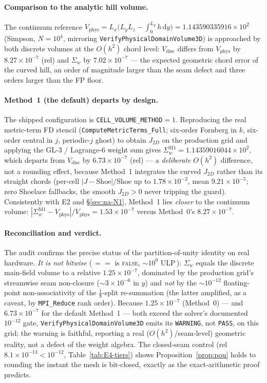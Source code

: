 \documentclass[11pt]{article}
\theoremstyle{definition}
\theoremstyle{remark}
\begin{document}
\paragraph{Comparison to the analytic hill volume.}
The continuum reference $V_{\mathrm{phys}}=L_x\bigl(L_yL_z-\int_0^{L_y}h\,\mathrm
dy\bigr)=1.143590335916\times10^{2}$ (Simpson, $N{=}10^4$, mirroring
\texttt{VerifyPhysicalDomainVolume3D}) is approached by both discrete volumes at
the $O(h^2)$ chord level: $V_{\mathrm{disc}}$ differs from $V_{\mathrm{phys}}$ by
$8.27\times10^{-7}$ (rel) and $\Sigma_w$ by $7.02\times10^{-7}$ --- the expected
geometric chord error of the curved hill, an order of magnitude larger than the
seam defect and three orders larger than the FP floor.

\paragraph{Method~1 (the default) departs by design.}
The shipped configuration is \texttt{CELL\_VOLUME\_METHOD}${=}1$. Reproducing the
real metric-term FD stencil (\texttt{ComputeMetricTerms\_Full}; six-order
Fornberg in $k$, six-order central in $j$, periodic-$j$ ghost) to obtain $J_{2D}$
on the production grid and applying the GL-3 / Lagrange-6 weight sum gives
$\Sigma_w^{\mathrm{M1}}=1.14359016044\times10^{2}$, which departs from
$V_{\mathrm{disc}}$ by $6.73\times10^{-7}$ (rel) --- a \emph{deliberate} $O(h^2)$
difference, not a rounding effect, because Method~1 integrates the curved
$J_{2D}$ rather than its straight chords (per-cell $|J\!-\!\text{Shoe}|/\text{Shoe}$
up to $1.78\times10^{-2}$, mean $9.21\times10^{-5}$; zero Shoelace fallbacks, the
smooth $J_{2D}{>}0$ never tripping the guard). Consistently with E2 and
\S\ref{sec:na-N1}, Method~1 lies \emph{closer} to the continuum volume:
$|\Sigma_w^{\mathrm{M1}}-V_{\mathrm{phys}}|/V_{\mathrm{phys}}=1.53\times10^{-7}$
versus Method~0's $8.27\times10^{-7}$.

\paragraph{Reconciliation and verdict.}
The audit confirms the precise status of the partition-of-unity identity on real
hardware. \emph{It is not bitwise} (\,$==$ is \textsc{false}, $\sim\!10^{9}$
ULP\,): $\Sigma_w$ equals the discrete main-field volume to a relative
$1.25\times10^{-7}$, dominated by the production grid's streamwise seam
non-closure ($\sim\!3\times10^{-6}$ in $y$) and \emph{not} by the
$\sim\!10^{-12}$ floating-point non-associativity of the $\tfrac18$-split
re-summation (the latter amplified, as a caveat, by \texttt{MPI\_Reduce} rank
order). Because $1.25\times10^{-7}$ (Method~0) --- and $6.73\times10^{-7}$ for
the default Method~1 --- both exceed the solver's documented $10^{-12}$ gate,
\texttt{VerifyPhysicalDomainVolume3D} emits its \texttt{WARNING}, not
\texttt{PASS}, on this grid; the warning is faithful, reporting a real
($O(h^2)$/seam-level) geometric reality, not a defect of the weight algebra. The
closed-seam control (rel $8.1\times10^{-13}{<}10^{-12}$,
Table~\ref{tab:E4-tiers}) shows Proposition~\ref{prop:pou} holds to rounding the
instant the mesh is bit-closed, exactly as the exact-arithmetic proof predicts.
\end{document}
